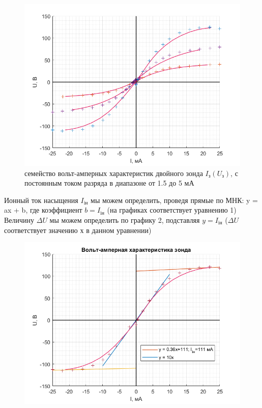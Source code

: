 \documentclass[a4paper,12pt]{article}
\begin{document}
\begin{enumerate}
\FloatBarrier 
\begin{figure}[h!]
\centering
\includegraphics[scale=0.6]{graph_sum.png}
\caption{семейство вольт-амперных характеристик двойного зонда $I_{\text{з}}(U_{\text{з}})$, с постоянным током разряда в диапазоне от 1.5 до 5 мА}
\end{figure}
Ионный ток насыщения $I_{\text{iн}}$ мы можем определить, проведя прямые по МНК: y = ax + b, где коэффициент $b = I_{\text{iн}}$ (на графиках соответствует уравнению 1) \\
Величину $\Delta U$ мы можем определить по графику 2, подставляя $y=I_{\text{iн}}$ ($\Delta U$ соответствует значению х в данном уравнении)
\begin{figure}[h!]
\centering
\includegraphics[scale=0.6]{graph_1_1.png}

\end{figure}
\end{enumerate}
\end{document}
